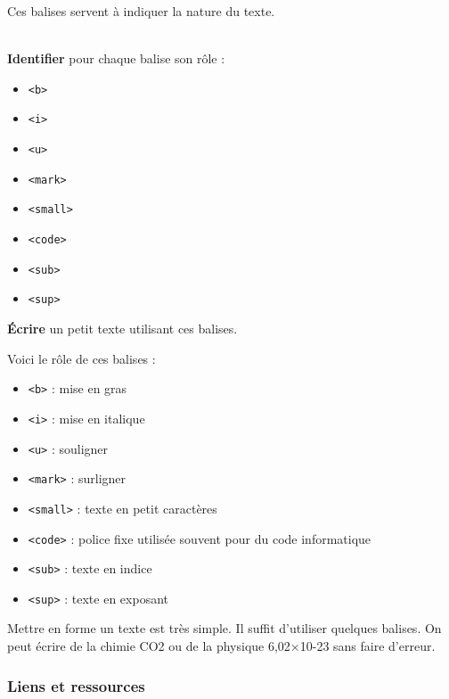 \documentclass[a4paper,17pt]{extarticle}
\newenvironment{eleve}%
{\begin{activite}\color{noiramu}\\}
{\end{activite}}
\providecommand{\tightlist}{%
      \setlength{\itemsep}{0pt}\setlength{\parskip}{0pt}}
\begin{document}
Ces balises servent à indiquer la nature du texte.
\begin{eleve}
    \textbf{Identifier} pour chaque balise son rôle :

\begin{itemize}
\tightlist
\item
  \texttt{\textless{}b\textgreater{}}
\item
  \texttt{\textless{}i\textgreater{}}
\item
  \texttt{\textless{}u\textgreater{}}
\item
  \texttt{\textless{}mark\textgreater{}}
\item
  \texttt{\textless{}small\textgreater{}}
\item
  \texttt{\textless{}code\textgreater{}}
\item
  \texttt{\textless{}sub\textgreater{}}
\item
  \texttt{\textless{}sup\textgreater{}}
\end{itemize}

\textbf{Écrire} un petit texte utilisant ces balises.
        
        \end{eleve}\begin{reponse}
    Voici le rôle de ces balises :

\begin{itemize}
\tightlist
\item
  \texttt{\textless{}b\textgreater{}} : mise en gras
\item
  \texttt{\textless{}i\textgreater{}} : mise en italique
\item
  \texttt{\textless{}u\textgreater{}} : souligner
\item
  \texttt{\textless{}mark\textgreater{}} : surligner
\item
  \texttt{\textless{}small\textgreater{}} : texte en petit caractères
\item
  \texttt{\textless{}code\textgreater{}} : police fixe utilisée souvent
  pour du code informatique
\item
  \texttt{\textless{}sub\textgreater{}} : texte en indice
\item
  \texttt{\textless{}sup\textgreater{}} : texte en exposant
\end{itemize}

Mettre en forme un texte est très simple. Il suffit d'utiliser quelques
balises. On peut écrire de la chimie CO2 ou de la physique 6,02×10-23
sans faire d'erreur.

            \end{reponse}
    \hypertarget{liens-et-ressources}{%
\subsubsection{Liens et ressources}\label{liens-et-ressources}}
\end{document}
